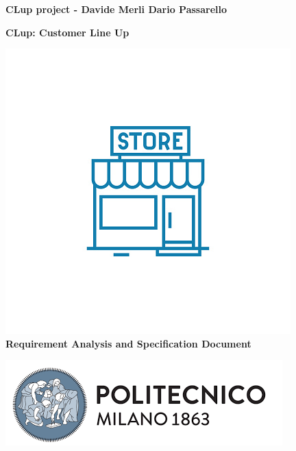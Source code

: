 




\begin{titlepage}

  \begin{center}
    \textbf{\small{CLup project - Davide Merli Dario Passarello}} \\ [2cm]
  \end{center}


  \begin{center}
    \textbf{\Huge{CLup: Customer Line Up}}

    \includegraphics[scale=2]{Images/logo.png} \\ [1cm]

    \textbf{\Huge{Requirement Analysis and Specification Document}} \\ [7cm]
  \end{center}

  \centering
  \includegraphics[scale=0.6]{Images/PolimiLogo.png}

\end{titlepage}

